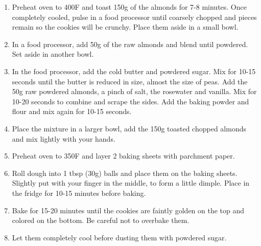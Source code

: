 \begin{enumerate}
    \item Preheat oven to 400\degree F and toast 150g of the almonds for 7-8 minutes. Once completely cooled, pulse in a food processor until coarsely chopped and pieces remain so the cookies will be crunchy. Place them aside in a small bowl.
    \item In a food processor, add 50g of the raw almonds and blend until powdered. Set aside in another bowl.
    \item In the food processor, add the cold butter and powdered sugar. Mix for 10-15 seconds until the butter is reduced in size, almost the size of peas. Add the 50g raw powdered almonds, a pinch of salt, the rosewater and vanilla. Mix for 10-20 seconds to combine and scrape the sides. Add the baking powder and flour and mix again for 10-15 seconds.
    \item Place the mixture in a larger bowl, add the 150g toasted  chopped almonds and mix lightly with your hands.
    \item Preheat oven to 350\degree F and layer 2 baking sheets with parchment paper.
    \item Roll dough into 1 tbsp (30g) balls and place them on the baking sheets. Slightly put with your finger in the middle, to form a little dimple. Place in the fridge for 10-15 minutes before baking.
    \item Bake for 15-20 minutes until the cookies are faintly golden on the top and colored on the bottom. Be careful not to overbake them.
    \item Let them completely cool before dusting them with powdered sugar.
\end{enumerate}
